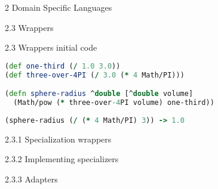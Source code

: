 \documentclass[11pt]{PalisadesLakesBook}
\begin{document}
\begin{plSection}{}
\begin{plSection}{2 Domain Specific Languages}
\begin{plSection}{2.3 Wrappers}
\begin{plSection}{2.3 Wrappers initial code}
\begin{plListing}
\begin{lstlisting}[language=clojure]
(def one-third (/ 1.0 3.0))
(def three-over-4PI (/ 3.0 (* 4 Math/PI)))

(defn sphere-radius ^double [^double volume]
  (Math/pow (* three-over-4PI volume) one-third)) 
  
(sphere-radius (/ (* 4 Math/PI) 3)) -> 1.0
\end{lstlisting}
\end{plListing}

\end{plSection}%
\begin{plSection}{2.3.1 Specialization wrappers}
\end{plSection}%
\begin{plSection}{2.3.2 Implementing specializers}
\end{plSection}%
\begin{plSection}{2.3.3 Adapters}
\end{plSection}%
\end{plSection}%
\end{plSection}%
\end{plSection}%
\end{document}
